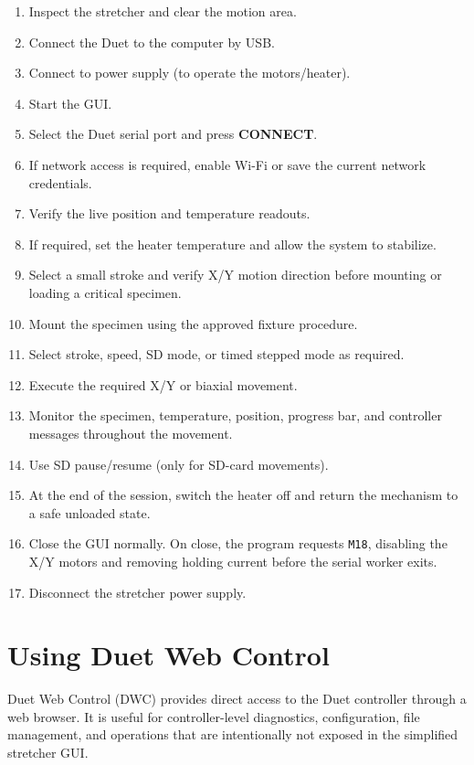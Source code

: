 \documentclass[11pt,a4paper]{article}
\begin{document}
\begin{enumerate}
  \item Inspect the stretcher and clear the motion area.
  \item Connect the Duet to the computer by USB.
  \item Connect to power supply (to operate the motors/heater).
  \item Start the GUI.
  \item Select the Duet serial port and press \textbf{CONNECT}.
  \item If network access is required, enable Wi-Fi or save the current network credentials.
  \item Verify the live position and temperature readouts.
  \item If required, set the heater temperature and allow the system to stabilize.
  \item Select a small stroke and verify X/Y motion direction before mounting or loading a critical specimen.
  \item Mount the specimen using the approved fixture procedure.
  \item Select stroke, speed, SD mode, or timed stepped mode as required.
  \item Execute the required X/Y or biaxial movement.
  \item Monitor the specimen, temperature, position, progress bar, and controller messages throughout the movement.
  \item Use SD pause/resume (only for SD-card movements).
  \item At the end of the session, switch the heater off and return the mechanism to a safe unloaded state.
  \item Close the GUI normally. On close, the program requests \texttt{M18}, disabling the X/Y motors and removing holding current before the serial worker exits.
  \item Disconnect the stretcher power supply.
\end{enumerate}

\section{Using Duet Web Control}

Duet Web Control (DWC) provides direct access to the Duet controller through
a web browser. It is useful for controller-level diagnostics, configuration,
file management, and operations that are intentionally not exposed in the
simplified stretcher GUI.
\end{document}
